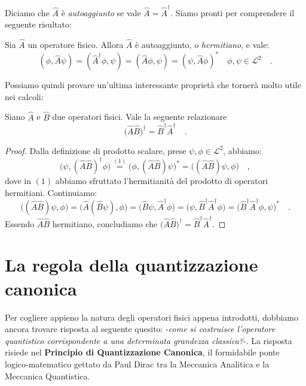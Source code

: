 Diciamo che $\hat{A}$ è \emph{autoaggiunto} se vale $\hat{A} = \hat{A}^{\dagger}$.
Siamo pronti per comprendere il seguente risultato:
\begin{teorema}
    Sia $\hat{A}$ un operatore fisico. Allora $\hat{A}$ è autoaggiunto, o \emph{hermitiano}, e vale:
    \begin{equation}
    (\phi, \hat{A}\psi) = (\hat{A}^{\dagger}\phi, \psi) = (\hat{A}\phi, \psi) = (\psi, \hat{A}\phi)^* \quad \phi, \psi \in \mathcal{L}^2 \quad.
    \label{eq:hermitiano}
    \end{equation}
\end{teorema}
Possiamo quindi provare un'ultima interessante proprietà che tornerà molto utile nei calcoli:
\begin{proprietà}
    Siano $\hat{A}$ e $\hat{B}$ due operatori fisici. Vale la seguente relazionare
\[
    \big(\hat{A}\hat{B}\big)^\dagger = \hat{B}^\dagger \hat{A}^\dagger \quad.
\]
\end{proprietà}
\begin{proof}
Dalla definizione di prodotto scalare, prese $\psi, \phi \in \mathcal{L}^2$, abbiamo:
\[
    \big( \psi, (\hat{A}\hat{B})^\dagger\phi \big) \overset{(1)}{=} \big( \phi, (\hat{A}\hat{B})\psi \big)^* = ( (\hat{A}\hat{B})\psi,\phi  \big)\quad,
\]
dove in $(1)$ abbiamo sfruttato l'hermitianità del prodotto di operatori hermitiani. Continuiamo:
\[
    ( (\hat{A}\hat{B})\psi,\phi  \big) = ( \hat{A}(\hat{B}\psi),\phi  \big) = ( \hat{B}\psi,\hat{A}^\dagger\phi  \big) = (\psi,\hat{B}^\dagger\hat{A}^\dagger\phi  \big) = (\hat{B}^\dagger\hat{A}^\dagger\phi, \psi  \big)^*\quad.
\]
Essendo $\hat{A}\hat{B}$ hermitiano, concludiamo che $\big(\hat{A}\hat{B}\big)^\dagger = \hat{B}^\dagger \hat{A}^\dagger$.
\end{proof}

\section{La regola della quantizzazione canonica}
Per cogliere appieno la natura degli operatori fisici appena introdotti, dobbiamo ancora trovare risposta al seguente quesito: -\emph{come si costruisce l'operatore quantistico corrispondente a una determinata grandezza classica?}-. La risposta risiede nel \textbf{Principio di Quantizzazione Canonica}, il formidabile ponte logico-matematico gettato da Paul Dirac tra la Meccanica Analitica e la Meccanica Quantistica.

